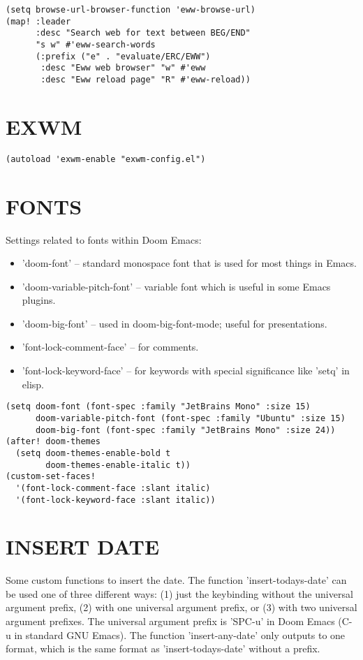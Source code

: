\documentclass[11pt]{article}
\begin{document}
\begin{verbatim}
(setq browse-url-browser-function 'eww-browse-url)
(map! :leader
      :desc "Search web for text between BEG/END"
      "s w" #'eww-search-words
      (:prefix ("e" . "evaluate/ERC/EWW")
       :desc "Eww web browser" "w" #'eww
       :desc "Eww reload page" "R" #'eww-reload))
\end{verbatim}

\section{EXWM}
\label{sec:org9138b7e}
\begin{verbatim}
(autoload 'exwm-enable "exwm-config.el")
\end{verbatim}

\section{FONTS}
\label{sec:org9813657}
Settings related to fonts within Doom Emacs:
\begin{itemize}
\item 'doom-font' -- standard monospace font that is used for most things in Emacs.
\item 'doom-variable-pitch-font' -- variable font which is useful in some Emacs plugins.
\item 'doom-big-font' -- used in doom-big-font-mode; useful for presentations.
\item 'font-lock-comment-face' -- for comments.
\item 'font-lock-keyword-face' -- for keywords with special significance like 'setq' in elisp.
\end{itemize}

\begin{verbatim}
(setq doom-font (font-spec :family "JetBrains Mono" :size 15)
      doom-variable-pitch-font (font-spec :family "Ubuntu" :size 15)
      doom-big-font (font-spec :family "JetBrains Mono" :size 24))
(after! doom-themes
  (setq doom-themes-enable-bold t
        doom-themes-enable-italic t))
(custom-set-faces!
  '(font-lock-comment-face :slant italic)
  '(font-lock-keyword-face :slant italic))
\end{verbatim}

\section{INSERT DATE}
\label{sec:orgb90e348}
Some custom functions to insert the date.  The function 'insert-todays-date' can be used one of three different ways: (1) just the keybinding without the universal argument prefix, (2) with one universal argument prefix, or (3) with two universal argument prefixes.  The universal argument prefix is 'SPC-u' in Doom Emacs (C-u in standard GNU Emacs).  The function 'insert-any-date' only outputs to one format, which is the same format as 'insert-todays-date' without a prefix.
\end{document}
